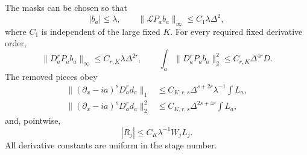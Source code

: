 \begin{lemma}\label{lem:frame-masks}
The masks can be chosen so that
\begin{equation}\label{eq:src15}
 |b_a|\leq\lambda,\qquad
 \|\mathcal L P_ab_a\|_\infty\leq C_1\lambda\Delta^2,
\end{equation}
where $C_1$ is independent of the large fixed $K$.  For every required
fixed derivative order,
\begin{equation}\label{eq:src16}
 \|D_a^rP_ab_a\|_\infty\leq C_{r,K}\lambda\Delta^{2r},
 \qquad
 \int_a\|D_a^rP_ab_a\|_2^2\leq C_{r,K}\Delta^{4r}D.
\end{equation}
The removed pieces obey
\begin{equation}\label{eq:src17}
 \begin{split}
 \|(\partial_x-ia)^sD_a^rd_a\|_1
 &\leq C_{K,r,s}\Delta^{s+2r}\lambda^{-1}\int L_a,\\
 \|(\partial_x-ia)^sD_a^rd_a\|_2^2
 &\leq C_{K,r,s}\Delta^{2s+4r}\int L_a,
 \end{split}
\end{equation}
and, pointwise,
\begin{equation}\label{eq:src18}
 |R_j|\leq C_K\lambda^{-1}W_jL_j.
\end{equation}
All derivative constants are uniform in the stage number.
\end{lemma}

